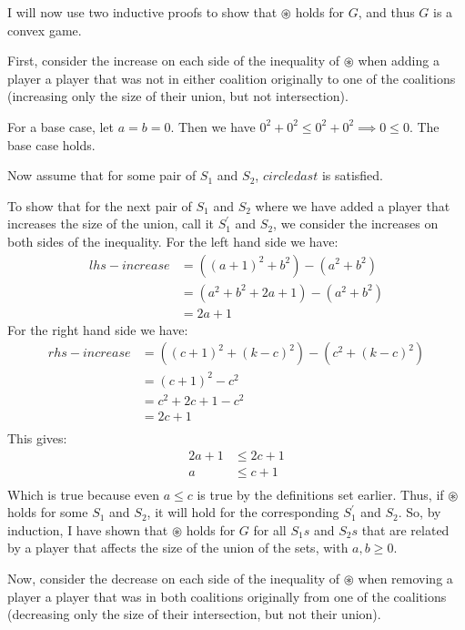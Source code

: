 \documentclass{article}
\begin{document}
\begin{enumerate}
I will now use two inductive proofs to show that $\circledast$ holds for $G$, and thus $G$ is a convex game.

First, consider the increase on each side of the inequality of $\circledast$ when adding a player a player that was not in either coalition originally to one of the coalitions (increasing only the size of their union, but not intersection).

For a base case, let $a = b = 0$. Then we have $0^{2} + 0^{2} \le 0^{2} + 0^{2} \implies 0 \le 0$. The base case holds.

Now assume that for some pair of $S_{1}$ and $S_{2}$, $circledast$ is satisfied.

To show that for the next pair of $S_{1}$ and $S_{2}$ where we have added a player that increases the size of the union, call it $S_{1}^{\prime}$ and $S_{2}$, we consider the increases on both sides of the inequality.
For the left hand side we have:
\begin{align*}
lhs-increase  &=  ((a + 1)^{2} + b^{2})    - (a^{2} + b^{2})  \\
              &=  (a^{2} + b^{2} + 2a + 1) - (a^{2} + b^{2})  \\
              &=  2a + 1
\end{align*}
For the right hand side we have:
\begin{align*}
rhs-increase  &=  ((c + 1)^{2} + (k - c)^{2}) - (c^{2} + (k - c)^{2})  \\
              &=  (c + 1)^{2}  - c^{2} \\
              &=  c^{2} + 2c + 1 - c^{2} \\
              &=  2c + 1 \\
\end{align*}
This gives:
\begin{align*}
2a + 1 &\le 2c + 1 \\
a      &\le c + 1 \\
\end{align*}
Which is true because even $a \le c$ is true by the definitions set earlier. Thus, if $\circledast$ holds for some $S_{1}$ and $S_{2}$, it will hold for the corresponding $S_{1}^{\prime}$ and $S_{2}$. So, by induction, I have shown that $\circledast$ holds for $G$ for all $S_{1}s$ and $S_{2}s$ that are related by a player that affects the size of the union of the sets, with $a, b \ge 0$.

Now, consider the decrease on each side of the inequality of $\circledast$ when removing a player a player that was in both coalitions originally from one of the coalitions (decreasing only the size of their intersection, but not their union).


\end{enumerate}
\end{document}
